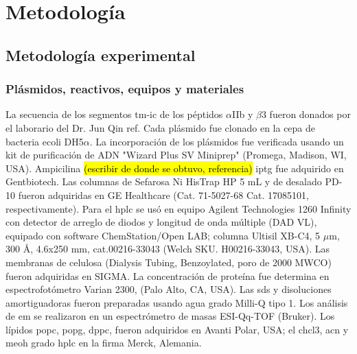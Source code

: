 \chapter{Metodología}\label{metod}

\section{Metodología experimental}

\subsection{Plásmidos, reactivos, equipos y materiales}
La secuencia de los segmentos \ac{tm}-\ac{ic} de los péptidos $\alpha$IIb y $\beta$3 fueron donados por el laborario del Dr. Jun Qin {ref}. Cada plásmido fue clonado en la cepa de bacteria \ac{ecoli} DH5$\alpha$. La incorporación de los plásmidos fue verificada usando un kit de purificación de ADN "Wizard Plus SV Miniprep" (Promega, Madison, WI, USA). Ampicilina \hl{(escribir de donde se obtuvo, referencia)}   \ac{iptg} fue adquirido en Gentbiotech. Las  columnas  de Sefarosa Ni HisTrap HP  5 mL y de desalado PD-10 fueron adquiridas en GE Healthcare (Cat. 71-5027-68 Cat. 17085101, respectivamente). Para el \ac{hplc} se usó en equipo Agilent Technologies 1260 Infinity con detector de arreglo de diodos y longitud de onda múltiple (DAD VL), equipado con software ChemStation/Open LAB; columna Ultisil XB-C4, 5 $\mu$m, 300 Å, 4.6x250 mm, cat.00216-33043 (Welch SKU. H00216-33043, USA). Las membranas de celulosa (Dialysis Tubing, Benzoylated, poro de 2000 MWCO) fueron adquiridas en SIGMA. La concentración de proteína fue determina en espectrofotómetro Varian 2300, (Palo Alto, CA, USA). Las \ac{sds} y disoluciones amortiguadoras fueron preparadas usando agua grado Milli-Q tipo 1. Los análisis de \ac{em} se realizaron en un espectrómetro de masas ESI-Qq-TOF (Bruker). 
Los lípidos \ac{popc}, \ac{popg}, \ac{dppc}, fueron adquiridos en Avanti Polar, USA; el  \ac{chcl3}, \ac{acn} y \ac{meoh} grado \ac{hplc} en la firma Merck, Alemania.


